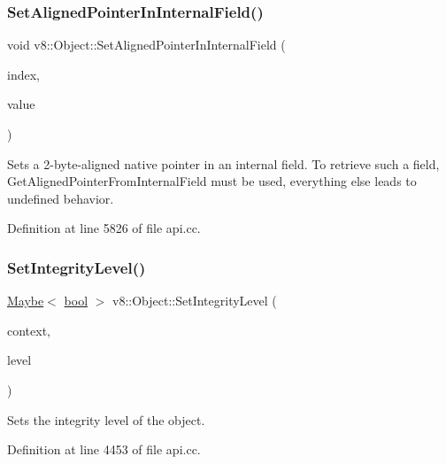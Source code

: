 \subsubsection{\texorpdfstring{Set\+Aligned\+Pointer\+In\+Internal\+Field()}{SetAlignedPointerInInternalField()}}
{\footnotesize\ttfamily void v8\+::\+Object\+::\+Set\+Aligned\+Pointer\+In\+Internal\+Field (\begin{DoxyParamCaption}\item[{\mbox{\hyperlink{classint}{int}}}]{index,  }\item[{void $\ast$}]{value }\end{DoxyParamCaption})}

Sets a 2-\/byte-\/aligned native pointer in an internal field. To retrieve such a field, Get\+Aligned\+Pointer\+From\+Internal\+Field must be used, everything else leads to undefined behavior. 

Definition at line 5826 of file api.\+cc.

\mbox{\label{classv8_1_1Object_aa13da0b73aea74f9a58250aa0677b73c}} 
\subsubsection{\texorpdfstring{Set\+Integrity\+Level()}{SetIntegrityLevel()}}
{\footnotesize\ttfamily \mbox{\hyperlink{classv8_1_1Maybe}{Maybe}}$<$ \mbox{\hyperlink{classbool}{bool}} $>$ v8\+::\+Object\+::\+Set\+Integrity\+Level (\begin{DoxyParamCaption}\item[{\mbox{\hyperlink{classv8_1_1Local}{Local}}$<$ Context $>$}]{context,  }\item[{\mbox{\hyperlink{namespacev8_a02642d03ff1eecc2fd358626499c2e30}{Integrity\+Level}}}]{level }\end{DoxyParamCaption})}

Sets the integrity level of the object. 

Definition at line 4453 of file api.\+cc.

\mbox{\label{classv8_1_1Object_aebf949a0592cebc144bb2f96bfb7ec72}} 
